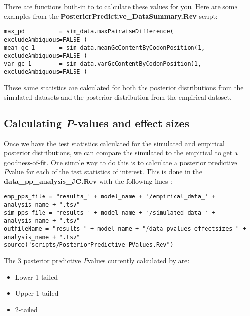 There are functions built-in to \RevBayes to calculate these values for you. Here are some examples
from the \textbf{PosteriorPredictive\_DataSummary.Rev} script: 

{\tt \begin{Snugshade}[184,207,236]
\begin{lstlisting}
max_pd          = sim_data.maxPairwiseDifference( excludeAmbiguous=FALSE )
mean_gc_1       = sim_data.meanGcContentByCodonPosition(1, excludeAmbiguous=FALSE )
var_gc_1        = sim_data.varGcContentByCodonPosition(1, excludeAmbiguous=FALSE )
\end{lstlisting}
\end{Snugshade}}

\smallbreak
These same statistics are calculated for both the posterior distributions from the simulated datasets
and the posterior distribution from the empirical dataset.

\subsection{Calculating \textit{P}-values and effect sizes}

Once we have the test statistics calculated for the simulated and empirical posterior distributions, 
we can compare the simulated to the empirical to get a goodness-of-fit. One simple way to do this is to calculate a posterior 
predictive \textit{P}\-value for each of the test statistics of interest. This is done in the \textbf{data\_pp\_analysis\_JC.Rev} with the following lines :

{\tt \begin{Snugshade}[184,207,236]
\begin{lstlisting}
emp_pps_file = "results_" + model_name + "/empirical_data_" + analysis_name + ".tsv"
sim_pps_file = "results_" + model_name + "/simulated_data_" + analysis_name + ".tsv"
outfileName = "results_" + model_name + "/data_pvalues_effectsizes_" + analysis_name + ".tsv"
source("scripts/PosteriorPredictive_PValues.Rev")
\end{lstlisting}
\end{Snugshade}}

The 3 posterior predictive \textit{P}\-values currently
calculated by \RevBayes are: 

\begin{itemize}
\item Lower 1-tailed 
\item Upper 1-tailed
\item 2-tailed
\end{itemize}


